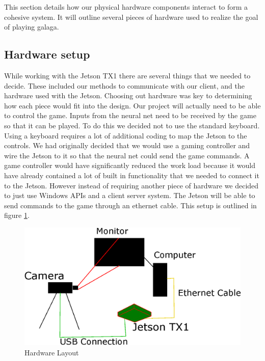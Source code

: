 This section details how our physical hardware components interact to form a cohesive system.
It will outline several pieces of hardware used to realize the goal of playing galaga.

\subsection{Hardware setup}%

While working with the Jetson TX1 there are several things that we needed to decide.
These included our methods to communicate with our client, and the hardware used with the Jetson.
Choosing out hardware was key to determining how each piece would fit into the design.
\newline
\newline
Our project will actually need to be able to control the game.
Inputs from the neural net need to be received by the game so that it can be played.
To do this we decided not to use the standard keyboard.
Using a keyboard requires a lot of additional coding to map the Jetson to the controls.
We had originally decided that we would use a gaming controller and wire the Jetson to it so that the neural net could send the game commands.
A game controller would have significantly reduced the work load because it would have already contained a lot of built in functionality that we needed to connect it to the Jetson.
However instead of requiring another piece of hardware we decided to just use Windows APIs and a client server system.
The Jetson will be able to send commands to the game through an ethernet cable.
This setup is outlined in figure \ref{fig:4.2}.
\newline
\newline
\begin{figure}
  \includegraphics[width=\textwidth]{design.eps}
  \caption{Hardware Layout}
  \label{fig:4.2}
\end{figure}%
